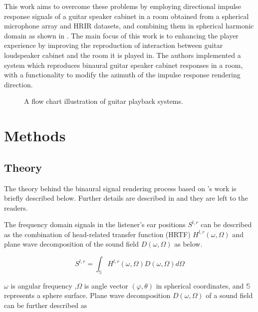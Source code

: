 \documentclass[convention,e-brief]{aesconf-current}
\begin{document}
This work aims to overcome these problems by employing directional impulse response signals of a guitar speaker cabinet in a room obtained from a spherical microphone array and HRIR datasets, and combining them in spherical harmonic domain as shown in \cite{Andersson2017-qg}.
The main focus of this work is to enhancing the player experience by improving the reproduction of interaction between guitar loudspeaker cabinet and the room it is played in.
The authors implemented a system which reproduces binaural guitar speaker cabinet responses in a room, with a functionality to modify the azimuth of the impulse response rendering direction.

\begin{figure}
    \begin{center}
        \caption{A flow chart illustration of guitar playback systems. } \label{fig:diag}
    \end{center}
\end{figure}



\section{Methods}

\subsection{Theory}
The theory behind the binaural signal rendering process based on \citet{Andersson2017-qg}'s work is briefly described below.
Further details are described in \cite{Andersson2017-qg} and they are left to the readers.

The frequency domain signals in the listener's ear positions $S^{l, r}$ can be described as the combination of head-related transfer function (HRTF) $H^{l, r}(\omega, \Omega)$ and plane wave decomposition of the sound field $D(\omega, \Omega)$ as below.

\begin{equation}
    \label{hrtf_pw}
    S^{l, r}=\int_{\mathbb{S}} H^{l, r}(\omega, \Omega) D(\omega, \Omega) d \Omega
\end{equation}

$\omega$ is angular frequency ,$\Omega$ is angle vector $(\varphi, \theta)$ in spherical coordinates, and $\mathbb{S}$ represents a sphere surface.
Plane wave decomposition $D(\omega, \Omega)$ of a sound field can be further described as
\end{document}
